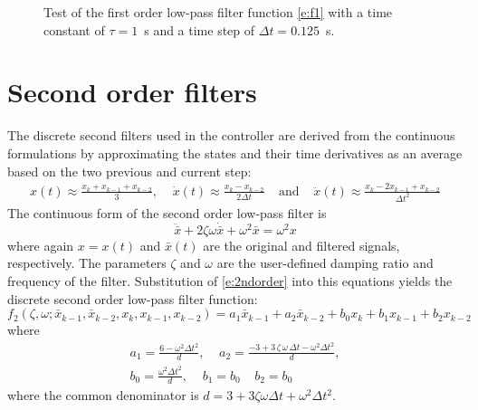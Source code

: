 \begin{figure}[t]
\centerline{ }
\caption{Test of the first order low-pass filter function \eqref{e:f1} with a time constant of $\tau=1$~s and a time step of $\Delta t = 0.125$~s. \label{f:f1}}
\end{figure}


\section{Second order filters}

The discrete second filters used in the controller are derived from the continuous formulations by approximating the states and their time derivatives as an average based on the two previous and current step:
\begin{align}\label{e:2ndorder}
x(t) \approx \frac{x_k+x_{k-1}+x_{k-2}}3,  \;\;\;\;\dot x(t)\approx \frac{x_k-x_{k-2}}{2\Delta t} \;\;\;\;\mbox{and} \;\;\;\;\ddot x(t)\approx \frac{x_k-2 x_{k-1}+ x_{k-2}}{\Delta t^2}
\end{align}
The continuous form of the second order low-pass filter is
\begin{equation}
\label{e:f2cont}
\ddot{\bar x} + 2 \zeta \omega \dot{\bar x} + \omega^2\bar x = \omega^2 x
\end{equation}
where again $x=x(t)$ and $\bar x(t)$ are the original and filtered signals, respectively. The parameters $\zeta$ and $\omega$ are the user-defined damping ratio and frequency of the filter. Substitution of \eqref{e:2ndorder} into this equations yields the discrete second order low-pass filter function:
\begin{equation}
\label{e:f2}
f_2 \left(\zeta, \omega; \bar x_{k-1} , \bar x_{k-2} , x_{k} , x_{k-1} , x_{k-2} \right) = a_1 \bar x_{k-1} + a_2 \bar x_{k-2} + b_0 x_k + b_1 x_{k-1}+ b_2 x_{k-2}
\end{equation}
where
\begin{gather}\nonumber
a_1=\frac {6-\omega^2 \Delta t^2}{d},
\;\;\;\;
a_2=\frac {-3+3\,\zeta\,\omega\,\Delta t-\omega^2\Delta t^2}{d}, \\
\label{e:f2coef}
b_0= \frac {\omega^2\Delta t^2}{d}, \;\;\;\; b_1 = b_0\;\;\;\; b_2 = b_0
\end{gather}
where the common denominator is $d=3+3 \zeta \omega \Delta t+\omega^2 \Delta t^2$.

